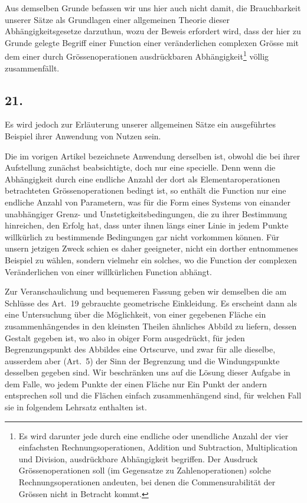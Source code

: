 \documentclass[12pt,a4paper]{book}
\theoremstyle{definition}
\theoremstyle{remark}
\begin{document}
Aus demselben Grunde befassen wir uns hier auch nicht damit, die Brauchbarkeit unserer Sätze als Grundlagen einer allgemeinen Theorie dieser Abhängigkeitsgesetze darzuthun, wozu der Beweis erfordert wird, dass der hier zu Grunde gelegte Begriff einer Function einer veränderlichen complexen Grösse mit dem einer durch Grössenoperationen ausdrückbaren Abhängigkeit\footnote{Es wird darunter jede durch eine endliche oder unendliche Anzahl der vier einfachsten Rechnungsoperationen, Addition und Subtraction, Multiplication und Division, ausdrückbare Abhängigkeit begriffen. Der Ausdruck Grössenoperationen soll (im Gegensatze zu Zahlenoperationen) solche Rechnungsoperationen andeuten, bei denen die Commensurabilität der Grössen nicht in Betracht kommt.} völlig zusammenfällt.

\subsection*{21.}

Es wird jedoch zur Erläuterung unserer allgemeinen Sätze ein ausgeführtes Beispiel ihrer Anwendung von Nutzen sein.

Die im vorigen Artikel bezeichnete Anwendung derselben ist, obwohl die bei ihrer Aufstellung zunächst beabsichtigte, doch nur eine specielle. Denn wenn die Abhängigkeit durch eine endliche Anzahl der dort als Elementaroperationen betrachteten Grössenoperationen bedingt ist, so enthält die Function nur eine endliche Anzahl von Parametern, was für die Form eines Systems von einander unabhängiger Grenz- und Unstetigkeitsbedingungen, die zu ihrer Bestimmung hinreichen, den Erfolg hat, dass unter ihnen längs einer Linie in jedem Punkte willkürlich zu bestimmende Bedingungen gar nicht vorkommen können. Für unsern jetzigen Zweck schien es daher geeigneter, nicht ein dorther entnommenes Beispiel zu wählen, sondern vielmehr ein solches, wo die Function der complexen Veränderlichen von einer willkürlichen Function abhängt.

Zur Veranschaulichung und bequemeren Fassung geben wir demselben die am Schlüsse des Art.~19 gebrauchte geometrische Einkleidung. Es erscheint dann als eine Untersuchung über die Möglichkeit, von einer gegebenen Fläche ein zusammenhängendes in den kleinsten Theilen ähnliches Abbild zu liefern, dessen Gestalt gegeben ist, wo also in obiger Form ausgedrückt, für jeden Begrenzungspunkt des Abbildes eine Ortscurve, und zwar für alle dieselbe, ausserdem aber (Art.~5) der Sinn der Begrenzung und die Windungspunkte desselben gegeben sind. Wir beschränken uns auf die Lösung dieser Aufgabe in dem Falle, wo jedem Punkte der einen Fläche nur Ein Punkt der andern entsprechen soll und die Flächen einfach zusammenhängend sind, für welchen Fall sie in folgendem Lehrsatz enthalten ist.
\end{document}
